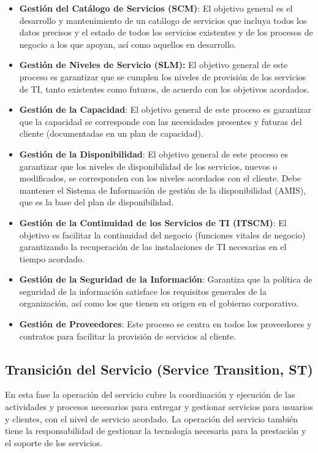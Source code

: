   
 \begin{itemize}
 	\item \textbf{Gestión del Catálogo de Servicios (SCM)}: El objetivo general es el desarrollo y mantenimiento de un catálogo de servicios que incluya todos los datos precisos y el estado de todos los servicios existentes y de los procesos de negocio a los que apoyan, así como aquellos en desarrollo. 
 	\item  \textbf{Gestión de Niveles de Servicio (SLM):} El objetivo general de este proceso es garantizar que se cumplen los niveles de provisión de los servicios de TI, tanto existentes como futuros, de acuerdo con los objetivos acordados. 
 	\item \textbf{Gestión de la Capacidad}: El objetivo general de este proceso es garantizar que la capacidad se corresponde con las necesidades presentes y futuras del cliente (documentadas en un plan de capacidad).
 	\item  \textbf{	Gestión de la Disponibilidad}: El objetivo general de este proceso es garantizar que los niveles de disponibilidad de los servicios, nuevos o modificados, se corresponden con los niveles acordados con el cliente. Debe mantener el Sistema de Información de gestión de la disponibilidad (AMIS), que es la base del plan de disponibilidad. 
 	 \item\textbf{ Gestión de la Continuidad de los Servicios de TI (ITSCM)}: El objetivo es facilitar la continuidad del negocio (funciones vitales de negocio) garantizando la recuperación de las instalaciones de TI necesarias en el tiempo acordado. 
 	 \item \textbf{Gestión de la Seguridad de la Información}: Garantiza que la política de seguridad de la información satisface los requisitos generales de la organización, así como los que tienen su origen en el gobierno corporativo.
 	\item \textbf{ Gestión de Proveedores}: Este proceso se centra en todos los proveedores y contratos para facilitar la provisión de servicios al cliente.
 	
 \end{itemize}
\subsection{Transición del Servicio (Service Transition, ST)}
En esta fase la operación del servicio cubre la coordinación y ejecución de las actividades y procesos necesarios para entregar y gestionar servicios para usuarios y clientes, con el nivel de servicio acordado. La operación del servicio también tiene la responsabilidad de gestionar la tecnología necesaria para la prestación y el soporte de los servicios.

